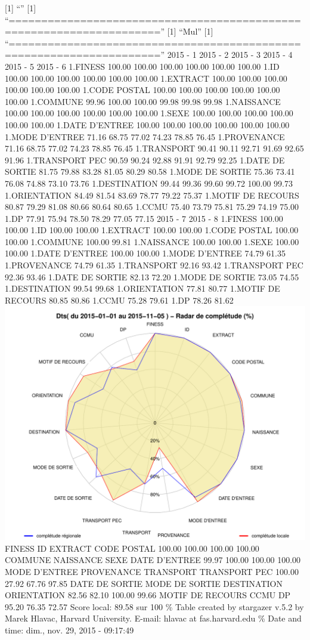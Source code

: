 \documentclass[]{article}
\begin{document}
{[}1{]} ``'' {[}1{]}
``=====================================================================''
{[}1{]} ``Mul'' {[}1{]}
``=====================================================================''
2015 - 1 2015 - 2 2015 - 3 2015 - 4 2015 - 5 2015 - 6 1.FINESS 100.00
100.00 100.00 100.00 100.00 100.00 1.ID 100.00 100.00 100.00 100.00
100.00 100.00 1.EXTRACT 100.00 100.00 100.00 100.00 100.00 100.00 1.CODE
POSTAL 100.00 100.00 100.00 100.00 100.00 100.00 1.COMMUNE 99.96 100.00
100.00 99.98 99.98 99.98 1.NAISSANCE 100.00 100.00 100.00 100.00 100.00
100.00 1.SEXE 100.00 100.00 100.00 100.00 100.00 100.00 1.DATE D'ENTREE
100.00 100.00 100.00 100.00 100.00 100.00 1.MODE D'ENTREE 71.16 68.75
77.02 74.23 78.85 76.45 1.PROVENANCE 71.16 68.75 77.02 74.23 78.85 76.45
1.TRANSPORT 90.41 90.11 92.71 91.69 92.65 91.96 1.TRANSPORT PEC 90.59
90.24 92.88 91.91 92.79 92.25 1.DATE DE SORTIE 81.75 79.88 83.28 81.05
80.29 80.58 1.MODE DE SORTIE 75.36 73.41 76.08 74.88 73.10 73.76
1.DESTINATION 99.44 99.36 99.60 99.72 100.00 99.73 1.ORIENTATION 84.49
81.54 83.69 78.77 79.22 75.37 1.MOTIF DE RECOURS 80.87 79.29 81.08 80.66
80.64 80.65 1.CCMU 75.40 73.79 75.81 75.29 74.19 75.00 1.DP 77.91 75.94
78.50 78.29 77.05 77.15 2015 - 7 2015 - 8 1.FINESS 100.00 100.00 1.ID
100.00 100.00 1.EXTRACT 100.00 100.00 1.CODE POSTAL 100.00 100.00
1.COMMUNE 100.00 99.81 1.NAISSANCE 100.00 100.00 1.SEXE 100.00 100.00
1.DATE D'ENTREE 100.00 100.00 1.MODE D'ENTREE 74.79 61.35 1.PROVENANCE
74.79 61.35 1.TRANSPORT 92.16 93.42 1.TRANSPORT PEC 92.36 93.46 1.DATE
DE SORTIE 82.13 72.20 1.MODE DE SORTIE 73.05 74.55 1.DESTINATION 99.54
99.68 1.ORIENTATION 77.81 80.77 1.MOTIF DE RECOURS 80.85 80.86 1.CCMU
75.28 79.61 1.DP 78.26 81.62
\includegraphics{completude_files/figure-latex/finess-4.pdf} FINESS ID
EXTRACT CODE POSTAL 100.00 100.00 100.00 100.00 COMMUNE NAISSANCE SEXE
DATE D'ENTREE 99.97 100.00 100.00 100.00 MODE D'ENTREE PROVENANCE
TRANSPORT TRANSPORT PEC 100.00 27.92 67.76 97.85 DATE DE SORTIE MODE DE
SORTIE DESTINATION ORIENTATION 82.56 82.10 100.00 99.66 MOTIF DE RECOURS
CCMU DP 95.20 76.35 72.57 Score local: 89.58 sur 100 \% Table created by
stargazer v.5.2 by Marek Hlavac, Harvard University. E-mail: hlavac at
fas.harvard.edu \% Date and time: dim., nov. 29, 2015 - 09:17:49
\end{document}
